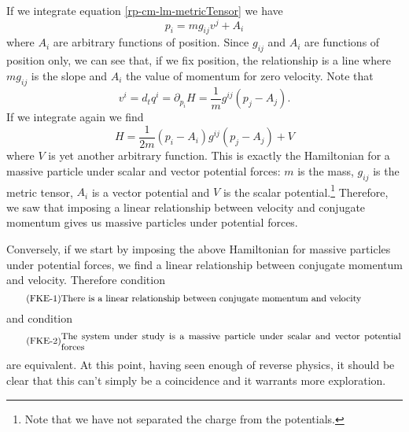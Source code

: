 If we integrate equation \ref{rp-cm-lm-metricTensor} we have
\begin{equation}
	p_i = m g_{ij} v^j + A_i
\end{equation}
where $A_i$ are arbitrary functions of position. Since $g_{ij}$ and $A_i$ are functions of position only, we can see that, if we fix position, the relationship is a line where $mg_{ij}$ is the slope and $A_i$ the value of momentum for zero velocity. Note that
\begin{equation}
	v^i = d_t q^i = \partial_{p_i} H = \frac{1}{m} g^{ij}(p_j - A_j).
\end{equation}
If we integrate again we find
\begin{equation}
	H = \frac{1}{2m}(p_i - A_i)g^{ij}(p_j - A_j) + V
\end{equation}
where $V$ is yet another arbitrary function. This is exactly the Hamiltonian for a massive particle under scalar and vector potential forces: $m$ is the mass, $g_{ij}$ is the metric tensor, $A_i$ is a vector potential and $V$ is the scalar potential.\footnote{Note that we have not separated the charge from the potentials.} Therefore, we saw that imposing a linear relationship between velocity and conjugate momentum gives us massive particles under potential forces.

Conversely, if we start by imposing the above Hamiltonian for massive particles under potential forces, we find a linear relationship between conjugate momentum and velocity. Therefore condition
\begin{equation}\label{rp-cm-fke-condLinearRelationship}
	\tag{FKE-1}
	\parbox{5in}{There is a linear relationship between conjugate momentum and velocity}
\end{equation}
and condition
\begin{equation}\label{rp-cm-fke-condMassiveParticle}
	\tag{FKE-2}
	\parbox{5in}{The system under study is a massive particle under scalar and vector potential forces}
\end{equation}
are equivalent. At this point, having seen enough of reverse physics, it should be clear that this can't simply be a coincidence and it warrants more exploration.

